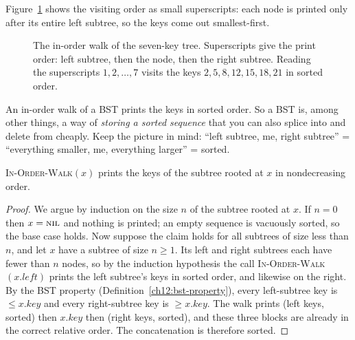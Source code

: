 Figure~\ref{ch12:fig-inorder} shows the visiting order as small superscripts: each node is
printed only after its entire left subtree, so the keys come out smallest-first.

\begin{figure}[H]
\centering
{}
\caption{The in-order walk of the seven-key tree. Superscripts give the print order:
left subtree, then the node, then the right subtree. Reading the superscripts $1,2,\dots,7$
visits the keys $2,5,8,12,15,18,21$ in sorted order.}
\label{ch12:fig-inorder}
\end{figure}

\begin{focusbox}
An in-order walk of a BST prints the keys in sorted order. So a BST is, among other things,
a way of \emph{storing a sorted sequence} that you can also splice into and delete from
cheaply. Keep the picture in mind: ``left subtree, me, right subtree'' = ``everything smaller,
me, everything larger'' = sorted.
\end{focusbox}

\begin{lemma}
\label{ch12:inorder-correct}
\textsc{In-Order-Walk}$(x)$ prints the keys of the subtree rooted at $x$ in nondecreasing
order.
\end{lemma}

\begin{proof}
We argue by induction on the size $n$ of the subtree rooted at $x$. If $n = 0$ then $x =
\textsc{nil}$ and nothing is printed; an empty sequence is vacuously sorted, so the base case
holds. Now suppose the claim holds for all subtrees of size less than $n$, and let $x$ have
a subtree of size $n \ge 1$. Its left and right subtrees each have fewer than $n$ nodes, so
by the induction hypothesis the call \textsc{In-Order-Walk}$(x.\mathit{left})$ prints the left
subtree's keys in sorted order, and likewise on the right. By the BST property
(Definition~\ref{ch12:bst-property}), every left-subtree key is $\le x.\mathit{key}$ and every
right-subtree key is $\ge x.\mathit{key}$. The walk prints (left keys, sorted) then $x.\mathit{key}$ then
(right keys, sorted), and these three blocks are already in the correct relative order. The
concatenation is therefore sorted.
\end{proof}

